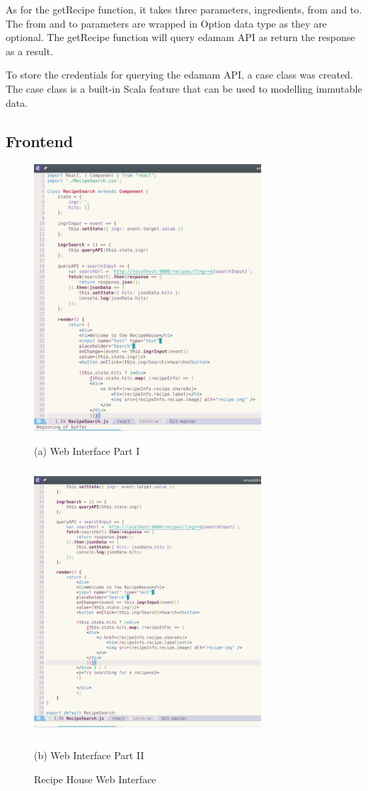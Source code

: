 \documentclass{article}
\begin{document}
\begin{normalsize}
  As for the getRecipe function, it takes three parameters, ingredients, from and to. The from and to parameters are wrapped in Option data type as they are optional. The getRecipe function will query edamam API as return the response
  as a result.

  To store the credentials for querying the edamam API, a case class was created. The case class is a built-in Scala feature that can be used to
  modelling immutable data.

  \subsection{Frontend}
    \begin{figure}[H]
    \begin{minipage}[b]{0.48\linewidth}
      \centering
      \centerline{\includegraphics[width=8.5cm, height=10cm]{react1}}
      \centerline{ (a) Web Interface Part I}\medskip
    \end{minipage}
    \hfill
    \begin{minipage}[b]{0.48\linewidth}
      \centering
      \centerline{\includegraphics[width=8.5cm, height=10cm]{react2}}
      \centerline{ (b) Web Interface Part II }\medskip
    \end{minipage}
    \caption{Recipe House Web Interface}
    \label{fig:react}
  \end{figure}


\end{normalsize}
\end{document}
